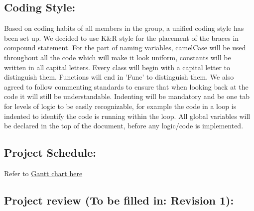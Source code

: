 \documentclass{article}
\begin{document}
\subsection*{Coding Style:}  
Based on coding habits of all members in the
group, a unified coding style has been set up. We decided to use K\&R style for
the placement of the braces in compound statement. For the part of naming
variables, camelCase will be used throughout all the code which will make it
look uniform, constants will be written in all capital letters. Every class will
begin with a capital letter to distinguish them. Functions will end in 'Func' to
distinguish them. We also agreed to follow commenting standards to ensure that
when looking back at the code it will still be understandable. Indenting will be
mandatory and be one tab for levels of logic to be easily recognizable, for
example the code in a loop is indented to identify the code is running within
the loop. All global variables will be declared in the top of the document,
before any logic/code is implemented.

\subsection*{Project Schedule:} Refer to  
\href{https://gitlab.cas.mcmaster.ca/pathmap/JSTanks/tree/master/ProjectSchedule}
{Gantt chart here}

\subsection*{Project review (To be filled in: Revision 1):}
\end{document}

